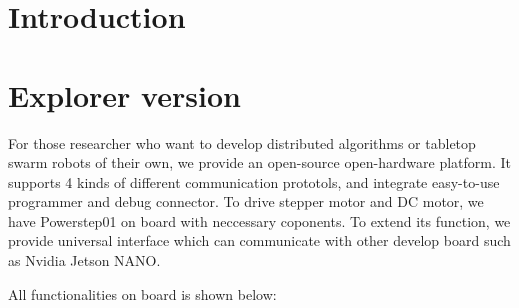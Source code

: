 \documentclass[sigconf]{acmart}
\begin{document}



\maketitle

\section{Introduction}


\section{Explorer version}

For those researcher who want to develop distributed algorithms or tabletop swarm robots of their own, we provide an open-source open-hardware platform. 
It supports 4 kinds of different communication prototols, and integrate easy-to-use programmer and debug connector. To drive stepper motor and DC motor, we have Powerstep01 on board with neccessary coponents.
To extend its function, we provide universal interface which can communicate with other develop board such as Nvidia Jetson NANO.

All functionalities on board is shown below:
\end{document}
